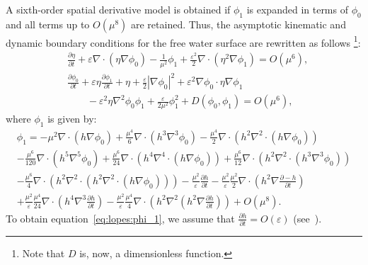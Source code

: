 A sixth-order spatial derivative model is obtained if $\phi_1$ is
expanded in terms of $\phi_0$ and all terms up to $O(\mu^8)$ are
retained.  Thus, the asymptotic kinematic and dynamic boundary
conditions for the free water surface are rewritten as follows
\footnote{Note that $D$ is, now, a dimensionless function.}:
\begin{subequations}
  \label{eq:lopes:kindyn}
  \begin{align}
    &\displaystyle\frac{\partial \eta}{\partial
      t}+\varepsilon\nabla\cdot(\eta\nabla\phi_0) -
    \frac{1}{\mu^2}\phi_1 +
    \frac{\varepsilon^2}{2}\nabla\cdot(\eta^2\nabla\phi_1)=O(\mu^{6}),
    \\ &\displaystyle
    \frac{\partial \phi_0}{\partial t}+\varepsilon\eta\frac{\partial
      \phi_1}{\partial t}+\eta + \frac{\varepsilon}{2}
    \left|\nabla\phi_0\right|^2 +
    \varepsilon^2\nabla\phi_0\cdot\eta\nabla\phi_1\nonumber
    \\ & \displaystyle \qquad
    -\varepsilon^2\eta\nabla^2\phi_0\phi_1
    +\frac{\varepsilon}{2\mu^2}\phi_1^2
    +D(\phi_0,\phi_1)
    =O(\mu^{6}),
  \end{align}
\end{subequations}
where $\phi_1$ is given by:
\begin{multline}\label{eq:lopes:phi_1}
  \phi_1= -\mu^{2}\nabla\cdot\left(h\nabla\phi_0\right)
  +\frac{\mu^{4}}{6}\nabla\cdot\left(h^3\nabla^3\phi_0\right)
  -\frac{\mu^{4}}{2}\nabla\cdot\left(h^2
    \nabla^2\cdot\left(h\nabla\phi_0\right) \right)\\
  -\frac{\mu^6}{120}\nabla\cdot\left(h^5\nabla^5\phi_0\right)+
  \frac{\mu^6}{24}\nabla\cdot\left(h^4\nabla^4\cdot
    \left(h\nabla\phi_0\right)\right) +
  \frac{\mu^6}{12}\nabla\cdot\left(h^2\nabla^2\cdot
    \left(h^3\nabla^3\phi_0\right)\right)\\
  - \frac{\mu^6}{4}\nabla\cdot\left(h^2\nabla^2 \cdot
    \left(h^2\nabla^2\cdot\left(h\nabla\phi_0\right)\right)\right)
  -\frac{\mu^2}{\varepsilon}\frac{\partial h}{\partial t}-
  \frac{\mu^2}{\varepsilon}\frac{\mu^2}{2}\nabla \cdot
  \left(h^2\nabla\frac{\partial - h}{\partial t}\right)\\
  +\frac{\mu^2}{\varepsilon}\frac{\mu^4}{24}\nabla \cdot
  \left(h^4\nabla^3 \frac{\partial h}{\partial t}\right)
  -\frac{\mu^2}{\varepsilon}\frac{\mu^4}{4}\nabla \cdot
  \left(h^2\nabla^2\left(h^2\nabla\frac{\partial h}{\partial
        t}\right)\right)+O(\mu^{8}).
\end{multline}
To obtain equation~\eqref{eq:lopes:phi_1}, we assume that
$\displaystyle\frac{\partial h}{\partial t}=O(\varepsilon)$
(see~\citet{DutykhDias2007}).

